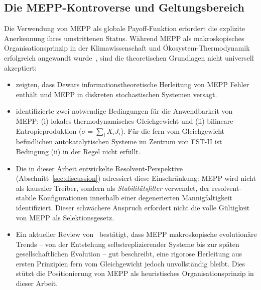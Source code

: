 \documentclass[12pt,a4paper]{article}
\theoremstyle{remark}
\begin{document}
\subsection{Die MEPP-Kontroverse und Geltungsbereich}

Die Verwendung von MEPP als globale Payoff-Funktion erfordert die explizite Anerkennung ihres umstrittenen Status. Während MEPP als makroskopisches Organisationsprinzip in der Klimawissenschaft und Ökosystem-Thermodynamik erfolgreich angewandt wurde~\citep{MEPP2006}, sind die theoretischen Grundlagen nicht universell akzeptiert:

\begin{itemize}
\item \citet{GrinsteinLinsker2007} zeigten, dass Dewars informationstheoretische Herleitung von MEPP Fehler enthält und MEPP in diskreten stochastischen Systemen versagt.
\item \citet{Martyushev2010} identifizierte zwei notwendige Bedingungen für die Anwendbarkeit von MEPP: (i) lokales thermodynamisches Gleichgewicht und (ii) bilineare Entropieproduktion ($\sigma = \sum_i X_i J_i$). Für die fern vom Gleichgewicht befindlichen autokatalytischen Systeme im Zentrum von FST-II ist Bedingung (ii) in der Regel nicht erfüllt.
\item Die in dieser Arbeit entwickelte Resolvent-Perspektive (Abschnitt~\ref{sec:discussion}) adressiert diese Einschränkung: MEPP wird nicht als kausaler Treiber, sondern als \emph{Stabilitätsfilter} verwendet, der resolvent-stabile Konfigurationen innerhalb einer degenerierten Mannigfaltigkeit identifiziert. Dieser schwächere Anspruch erfordert nicht die volle Gültigkeit von MEPP als Selektionsgesetz.
\item Ein aktueller Review von~\citet{Toma2025} bestätigt, dass MEPP makroskopische evolutionäre Trends -- von der Entstehung selbstreplizierender Systeme bis zur späten gesellschaftlichen Evolution -- gut beschreibt, eine rigorose Herleitung aus ersten Prinzipien fern vom Gleichgewicht jedoch unvollständig bleibt. Dies stützt die Positionierung von MEPP als heuristisches Organisationsprinzip in dieser Arbeit.
\end{itemize}
\end{document}
